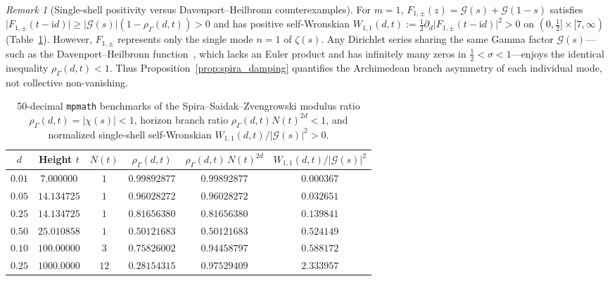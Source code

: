 \documentclass[11pt,reqno]{amsart}
\theoremstyle{definition}
\theoremstyle{remark}
\newtheorem{remark}[theorem]{Remark}
\numberwithin{equation}{section}
\newcommand{\ii}{\mathrm{i}}
\begin{document}
\begin{remark}[Single-shell positivity versus Davenport--Heilbronn counterexamples]\label{rem:davenport_heilbronn}
For $m = 1$, $F_{1,\pm}(z) = \mathcal{G}(s) + \mathcal{G}(1-s)$ satisfies $\lvert F_{1,\pm}(t - \ii d)\rvert \ge \lvert\mathcal{G}(s)\rvert(1 - \rho_\Gamma(d,t)) > 0$ and has positive self-Wronskian $W_{1,1}(d,t) := \frac{1}{2}\partial_d\lvert F_{1,\pm}(t-\ii d)\rvert^2 > 0$ on $(0, \frac{1}{2}] \times [7, \infty)$ (Table~\ref{tab:spira_benchmarks}). However, $F_{1,\pm}$ represents only the single mode $n = 1$ of $\zeta(s)$. Any Dirichlet series sharing the same Gamma factor $\mathcal{G}(s)$---such as the Davenport--Heilbronn function~\cite{davenportheilbronn1936}, which lacks an Euler product and has infinitely many zeros in $\frac{1}{2} < \sigma < 1$---enjoys the identical inequality $\rho_\Gamma(d,t) < 1$. Thus Proposition~\ref{prop:spira_damping} quantifies the Archimedean branch asymmetry of each individual mode, not collective non-vanishing.
\end{remark}

\begin{table}[t]
\centering
\caption{50-decimal \texttt{mpmath} benchmarks of the Spira--Saidak--Zvengrowski modulus ratio $\rho_\Gamma(d,t) = \lvert\chi(s)\rvert < 1$, horizon branch ratio $\rho_\Gamma(d,t)N(t)^{2d} < 1$, and normalized single-shell self-Wronskian $W_{1,1}(d,t)/\lvert\mathcal{G}(s)\rvert^2 > 0$.}\label{tab:spira_benchmarks}
\footnotesize
\setlength{\tabcolsep}{5.5pt}
\begin{tabular}{@{}cccccc@{}}
\toprule
$d$ & Height $t$ & $N(t)$ & $\rho_\Gamma(d,t)$ & $\rho_\Gamma(d,t)\,N(t)^{2d}$ & $W_{1,1}(d,t)/\lvert\mathcal{G}(s)\rvert^2$ \\
\midrule
$0.01$ & $7.000000$  & $1$  & $0.99892877$ & $0.99892877$ & $0.000367$ \\
$0.05$ & $14.134725$ & $1$  & $0.96028272$ & $0.96028272$ & $0.032651$ \\
$0.25$ & $14.134725$ & $1$  & $0.81656380$ & $0.81656380$ & $0.139841$ \\
$0.50$ & $25.010858$ & $1$  & $0.50121683$ & $0.50121683$ & $0.524149$ \\
$0.10$ & $100.00000$ & $3$  & $0.75826002$ & $0.94458797$ & $0.588172$ \\
$0.25$ & $1000.0000$ & $12$ & $0.28154315$ & $0.97529409$ & $2.333957$ \\
\bottomrule
\end{tabular}
\end{table}
\end{document}
